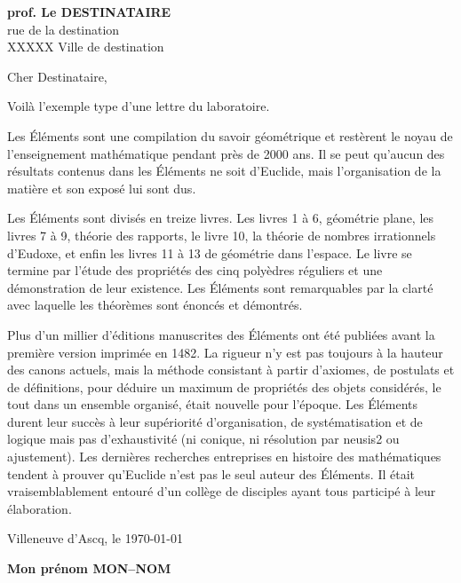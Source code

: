 \documentclass[a4paper,11pt]{article}
\begin{document}
\pagestyle{empty}
\laboheader
\labofooter
\begin{destinataire}
  \textbf{prof. Le DESTINATAIRE}\\
  rue de la destination\\
  XXXXX Ville de destination\\
\end{destinataire}


\renewcommand{\baselinestretch}{1.3}\selectfont
\hspace{4cm}Cher Destinataire,
\vspace{4mm}

Voilà l'exemple type d'une lettre du laboratoire.

Les Éléments sont une compilation du savoir géométrique et restèrent le noyau de l'enseignement mathématique pendant près de 2000 ans. Il se peut qu'aucun des résultats contenus dans les Éléments ne soit d'Euclide, mais l'organisation de la matière et son exposé lui sont dus.

Les Éléments sont divisés en treize livres. Les livres 1 à 6, géométrie plane, les livres 7 à 9, théorie des rapports, le livre 10, la théorie de nombres irrationnels d'Eudoxe, et enfin les livres 11 à 13 de géométrie dans l'espace. Le livre se termine par l'étude des propriétés des cinq polyèdres réguliers et une démonstration de leur existence. Les Éléments sont remarquables par la clarté avec laquelle les théorèmes sont énoncés et démontrés.

Plus d'un millier d'éditions manuscrites des Éléments ont été publiées avant la première version imprimée en 1482. La rigueur n'y est pas toujours à la hauteur des canons actuels, mais la méthode consistant à partir d'axiomes, de postulats et de définitions, pour déduire un maximum de propriétés des objets considérés, le tout dans un ensemble organisé, était nouvelle pour l'époque. Les Éléments durent leur succès à leur supériorité d'organisation, de systématisation et de logique mais pas d'exhaustivité (ni conique, ni résolution par neusis2 ou ajustement). Les dernières recherches entreprises en histoire des mathématiques tendent à prouver qu'Euclide n'est pas le seul auteur des Éléments. Il était vraisemblablement entouré d'un collège de disciples ayant tous participé à leur élaboration.


\vspace{1cm}

Villeneuve d'Ascq, le \today

\begin{expediteur}
  \textbf{Mon prénom MON--NOM}
\end{expediteur}
\end{document}
